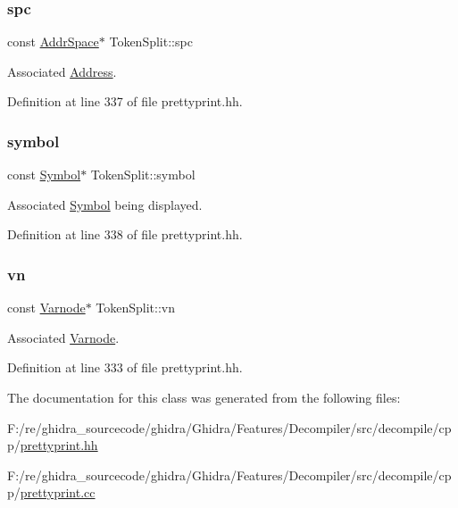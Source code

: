 \subsubsection{\texorpdfstring{spc}{spc}}
{\footnotesize\ttfamily const \mbox{\hyperlink{class_addr_space}{Addr\+Space}}$\ast$ Token\+Split\+::spc}



Associated \mbox{\hyperlink{class_address}{Address}}. 



Definition at line 337 of file prettyprint.\+hh.

\mbox{\label{class_token_split_a4e1f999157073f99be4d3aceae20b852}} 
\subsubsection{\texorpdfstring{symbol}{symbol}}
{\footnotesize\ttfamily const \mbox{\hyperlink{class_symbol}{Symbol}}$\ast$ Token\+Split\+::symbol}



Associated \mbox{\hyperlink{class_symbol}{Symbol}} being displayed. 



Definition at line 338 of file prettyprint.\+hh.

\mbox{\label{class_token_split_a68d23fb31a6eeda521dd3a4d20db7dc4}} 
\subsubsection{\texorpdfstring{vn}{vn}}
{\footnotesize\ttfamily const \mbox{\hyperlink{class_varnode}{Varnode}}$\ast$ Token\+Split\+::vn}



Associated \mbox{\hyperlink{class_varnode}{Varnode}}. 



Definition at line 333 of file prettyprint.\+hh.



The documentation for this class was generated from the following files\+:\begin{DoxyCompactItemize}
\item 
F\+:/re/ghidra\+\_\+sourcecode/ghidra/\+Ghidra/\+Features/\+Decompiler/src/decompile/cpp/\mbox{\hyperlink{prettyprint_8hh}{prettyprint.\+hh}}\item 
F\+:/re/ghidra\+\_\+sourcecode/ghidra/\+Ghidra/\+Features/\+Decompiler/src/decompile/cpp/\mbox{\hyperlink{prettyprint_8cc}{prettyprint.\+cc}}\end{DoxyCompactItemize}
